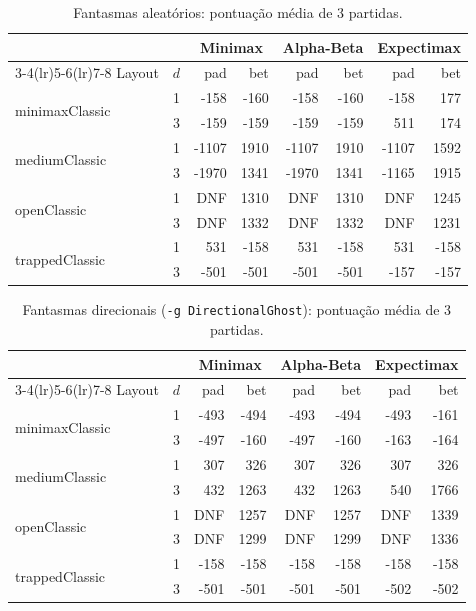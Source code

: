 \documentclass[11pt,a4paper]{article}
\begin{document}
\begin{table}[h]
\centering
\footnotesize
\caption{Fantasmas aleatórios: pontuação média de 3 partidas.}
\begin{tabular}{l c rr rr rr}
\toprule
 & & \multicolumn{2}{c}{Minimax} & \multicolumn{2}{c}{Alpha-Beta} & \multicolumn{2}{c}{Expectimax}\\
\cmidrule(lr){3-4}\cmidrule(lr){5-6}\cmidrule(lr){7-8}
Layout & $d$ & pad & bet & pad & bet & pad & bet \\
\midrule
\multirow{2}{*}{minimaxClassic} & 1 & -158 & -160 & -158 & -160 & -158 & 177 \\
                                & 3 & -159 & -159 & -159 & -159 & 511 & 174 \\
\multirow{2}{*}{mediumClassic}  & 1 & -1107 & 1910 & -1107 & 1910 & -1107 & 1592 \\
                                & 3 & -1970 & 1341 & -1970 & 1341 & -1165 & 1915 \\
\multirow{2}{*}{openClassic}    & 1 & DNF & 1310 & DNF & 1310 & DNF & 1245 \\
                                & 3 & DNF & 1332 & DNF & 1332 & DNF & 1231 \\
\multirow{2}{*}{trappedClassic} & 1 & 531 & -158 & 531 & -158 & 531 & -158 \\
                                & 3 & -501 & -501 & -501 & -501 & -157 & -157 \\
\bottomrule
\end{tabular}
\end{table}

\vspace{-0.3cm}
\begin{table}[h]
\centering
\footnotesize
\caption{Fantasmas direcionais (\texttt{-g DirectionalGhost}): pontuação média de 3 partidas.}
\begin{tabular}{l c rr rr rr}
\toprule
 & & \multicolumn{2}{c}{Minimax} & \multicolumn{2}{c}{Alpha-Beta} & \multicolumn{2}{c}{Expectimax}\\
\cmidrule(lr){3-4}\cmidrule(lr){5-6}\cmidrule(lr){7-8}
Layout & $d$ & pad & bet & pad & bet & pad & bet \\
\midrule
\multirow{2}{*}{minimaxClassic} & 1 & -493 & -494 & -493 & -494 & -493 & -161 \\
                                & 3 & -497 & -160 & -497 & -160 & -163 & -164 \\
\multirow{2}{*}{mediumClassic}  & 1 & 307 & 326 & 307 & 326 & 307 & 326 \\
                                & 3 & 432 & 1263 & 432 & 1263 & 540 & 1766 \\
\multirow{2}{*}{openClassic}    & 1 & DNF & 1257 & DNF & 1257 & DNF & 1339 \\
                                & 3 & DNF & 1299 & DNF & 1299 & DNF & 1336 \\
\multirow{2}{*}{trappedClassic} & 1 & -158 & -158 & -158 & -158 & -158 & -158 \\
                                & 3 & -501 & -501 & -501 & -501 & -502 & -502 \\
\bottomrule
\end{tabular}
\end{table}
\end{document}
